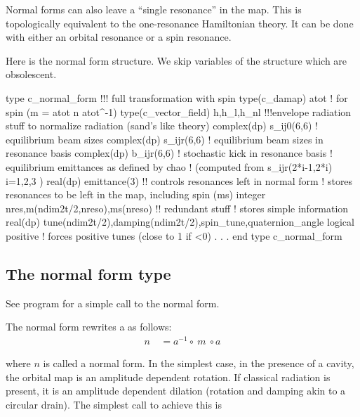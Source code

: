 \documentclass{hitec}     %
\def\tc{https://twikinew.ihep.ac.cn/pubfppptc/Web/Programs/}
\begin{document}
{{{{{{{{{{{{{{{{{{{ Normal forms can also leave a ``single resonance'' in the map. This is topologically equivalent to the one-resonance Hamiltonian theory. It can be done with either an orbital resonance or a spin resonance.  
 
Here is the normal form structure. We skip variables of the structure   which are obsolescent.

 \begin{code}
type c_normal_form
!!!  full transformation with spin 
 type(c_damap) atot  !   for spin   (m = atot n atot^-1)
 type(c_vector_field) h,h_l,h_nl
!!!envelope radiation stuff to normalize radiation (sand's like theory)
 complex(dp) s_ij0(6,6)  !   equilibrium beam sizes
 complex(dp) s_ijr(6,6)  !   equilibrium beam sizes in resonance basis
 complex(dp) b_ijr(6,6)  !    stochastic kick in resonance basis
!  equilibrium emittances as defined by chao 
! (computed from s_ijr(2*i-1,2*i) i=1,2,3 )
 real(dp) emittance(3)  
!! controls resonances left in normal form
! stores resonances to be left in the map, including spin (ms)
 integer nres,m(ndim2t/2,nreso),ms(nreso) 
!! redundant stuff
! stores simple information
 real(dp) tune(ndim2t/2),damping(ndim2t/2),spin_tune,quaternion_angle 
 logical positive ! forces positive tunes (close to 1 if <0)
 	.
 	.
 	.
end type c_normal_form
\end{code}

  
  \subsection{ The normal form type}\label{s:normalform}
  
  See program \href{\tc z_track_normal_tpsa.f90}{}    for a simple call to the normal form.

  
  The normal form rewrites a  as follows:
%
\begin{align} n\ &={a}^{-1}\circ \ m\ \circ a \label{eq:normalf}\end{align}

where $n$ is called a normal form. In the simplest case, in the presence of a cavity, the orbital map is an amplitude dependent rotation. If classical radiation is present, it is an amplitude dependent dilation (rotation and damping akin to a circular drain).  The simplest call to achieve this is

}}}}}}}}}}}}}}}}}}}
\end{document}
